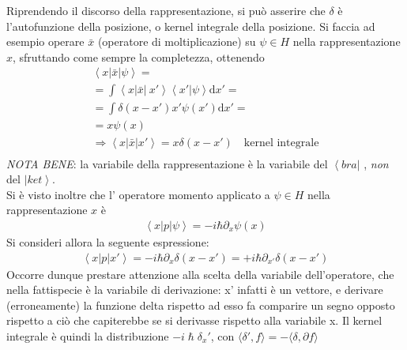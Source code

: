 Riprendendo il discorso della rappresentazione, si può asserire che $\delta$ è l'autofunzione della posizione, o kernel integrale della posizione.
Si faccia ad esempio operare $\bar x$ (operatore di moltiplicazione) su $\psi\in\textit{H}$ nella rappresentazione $x$, sfruttando come sempre la completezza, ottenendo
 \begin{equation}\begin{split}
\left\langle x|\bar x|\psi  \right\rangle=\\
=\int{\left\langle x|\bar x|\ x'\right\rangle \left\langle x'|\psi\right\rangle\textrm{d}x'}=\\
=\int{\delta\left(x-x'\right)x'\psi(x')\textrm{d}x'}=\\
=x\psi \left(x\right)\\
\Longrightarrow \left\langle x|\bar x|x' \right\rangle=x\delta\left(x-x'\right) \quad \text{kernel integrale}\\
 \end{split}\end{equation}
\textit{NOTA BENE}: la variabile della rappresentazione  è la variabile  del $\left\langle bra\right |$ , \textit{non} del $\left |ket \right\rangle$.\\
Si è visto inoltre che l' operatore momento applicato a $\psi\in H$ nella rappresentazione $x$ è
 \begin{equation}\begin{split}
\left\langle x|p|\psi  \right\rangle=-i\hbar \partial _x\psi \left(x\right)
 \end{split}\end{equation}
Si consideri allora la seguente espressione:
 \begin{equation}\begin{split}
\left\langle x|p|x' \right\rangle=-i\hbar \partial _x\delta\left(x-x'\right)=+i\hbar \partial _{x'}\delta\left(x-x'\right)
 \end{split}\end{equation}
Occorre dunque prestare attenzione alla scelta della variabile dell'operatore, che nella fattispecie è la variabile di derivazione: x' infatti è un vettore, e derivare (erroneamente) la funzione delta rispetto ad esso  fa comparire un segno opposto rispetto a ciò che capiterebbe se si derivasse rispetto alla variabile x.
Il kernel integrale è quindi la distribuzione $-i\hslash\delta_x'$, con $\langle\delta',f\rangle=-\langle\delta,\partial f\rangle$

